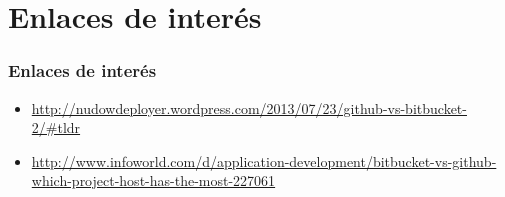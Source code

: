\section{Enlaces de interés}
\frame
{
\frametitle{Enlaces de interés}
\begin{itemize}
\item \url{http://nudowdeployer.wordpress.com/2013/07/23/github-vs-bitbucket-2/\#tldr}
\item \url{http://www.infoworld.com/d/application-development/bitbucket-vs-github-which-project-host-has-the-most-227061}
\end{itemize}
}